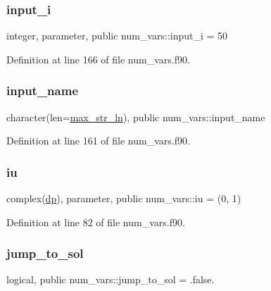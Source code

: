 \subsubsection{\texorpdfstring{input\+\_\+i}{input\_i}}
{\footnotesize\ttfamily integer, parameter, public num\+\_\+vars\+::input\+\_\+i = 50}



Definition at line 166 of file num\+\_\+vars.\+f90.

\mbox{\label{namespacenum__vars_a1a16a5fdda7aaacdffd14f1ad29f5e8b}} 
\subsubsection{\texorpdfstring{input\+\_\+name}{input\_name}}
{\footnotesize\ttfamily character(len=\hyperlink{namespacenum__vars_a3ff2bb983ee80a6735277d6789e6ce7c}{max\+\_\+str\+\_\+ln}), public num\+\_\+vars\+::input\+\_\+name}



Definition at line 161 of file num\+\_\+vars.\+f90.

\mbox{\label{namespacenum__vars_a3b9303c24ebbdff7b366337702795211}} 
\subsubsection{\texorpdfstring{iu}{iu}}
{\footnotesize\ttfamily complex(\hyperlink{namespacenum__vars_a03802aa2bd86439d7a9370836fabf3f2}{dp}), parameter, public num\+\_\+vars\+::iu = (0, 1)}



Definition at line 82 of file num\+\_\+vars.\+f90.

\mbox{\label{namespacenum__vars_acd9fb4b84728c986d5ecde709dcac940}} 
\subsubsection{\texorpdfstring{jump\+\_\+to\+\_\+sol}{jump\_to\_sol}}
{\footnotesize\ttfamily logical, public num\+\_\+vars\+::jump\+\_\+to\+\_\+sol = .false.}



